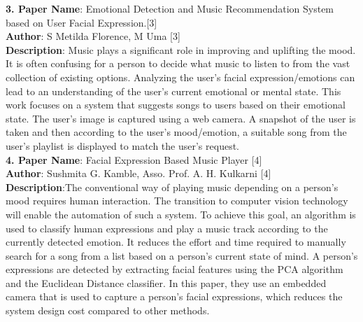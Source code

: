\documentclass[12pt]{report}
\begin{document}
\setlength{\parindent}{0em}
\textbf{3. Paper Name}:  Emotional Detection and Music Recommendation System based on User
Facial Expression.[3]\\
\textbf{Author}: S Metilda Florence, M Uma [3]\\
\textbf{Description}:  Music plays a significant role in improving and uplifting the mood. It is often 
confusing for a person to decide what music to listen to from the vast collection of existing 
options. Analyzing the user's facial expression/emotions can lead to an understanding of the 
user's current emotional or mental state. This work focuses on a system that suggests songs to 
users based on their emotional state. The user's image is captured using a web camera. A 
snapshot of the user is taken and then according to the user's mood/emotion, a suitable song 
from the user's playlist is displayed to match the user's request.\\

\setlength{\parindent}{0em}
\textbf{4. Paper Name}: Facial Expression Based Music Player [4]\\
\textbf{Author}: Sushmita G. Kamble, Asso. Prof. A. H. Kulkarni [4]\\
\textbf{Description}:The conventional way of playing music depending on a person's mood requires 
human interaction. The transition to computer vision technology will enable the automation of 
such a system. To achieve this goal, an algorithm is used to classify human expressions and 
play a music track according to the currently detected emotion. It reduces the effort and time 
required to manually search for a song from a list based on a person's current state of mind. A 
person's expressions are detected by extracting facial features using the PCA algorithm and 
the Euclidean Distance classifier. In this paper, they use an embedded camera that is used to 
capture a person's facial expressions, which reduces the system design cost compared to other 
methods.\\
\vspace{7 cm}
\end{document}
